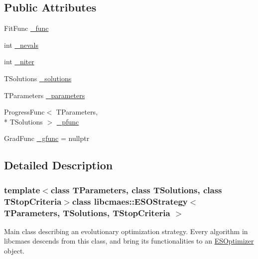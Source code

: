 \subsection*{Public Attributes}
\begin{DoxyCompactItemize}
\item 
Fit\-Func \hyperlink{classlibcmaes_1_1ESOStrategy_a1a29d4c30bbdb6021920275e81fa4dc4}{\-\_\-func}
\item 
int \hyperlink{classlibcmaes_1_1ESOStrategy_a19667f1e69856e7cfd6219b63cbaa59d}{\-\_\-nevals}
\item 
int \hyperlink{classlibcmaes_1_1ESOStrategy_aaf5c063558da34826ea1f976423ccfbb}{\-\_\-niter}
\item 
T\-Solutions \hyperlink{classlibcmaes_1_1ESOStrategy_a8fe0f8dc2201951e9e4ed2768b5a09ab}{\-\_\-solutions}
\item 
T\-Parameters \hyperlink{classlibcmaes_1_1ESOStrategy_a295e49238ceef8f11b3fb35296a8364a}{\-\_\-parameters}
\item 
Progress\-Func$<$ T\-Parameters, \\*
T\-Solutions $>$ \hyperlink{classlibcmaes_1_1ESOStrategy_a25d597189596f434a2530887fddea189}{\-\_\-pfunc}
\item 
Grad\-Func \hyperlink{classlibcmaes_1_1ESOStrategy_a76926e49a2ca941a22362167bc230093}{\-\_\-gfunc} = nullptr
\end{DoxyCompactItemize}


\subsection{Detailed Description}
\subsubsection*{template$<$class T\-Parameters, class T\-Solutions, class T\-Stop\-Criteria$>$class libcmaes\-::\-E\-S\-O\-Strategy$<$ T\-Parameters, T\-Solutions, T\-Stop\-Criteria $>$}

Main class describing an evolutionary optimization strategy. Every algorithm in libcmaes descends from this class, and bring its functionalities to an \hyperlink{classlibcmaes_1_1ESOptimizer}{E\-S\-Optimizer} object. 

